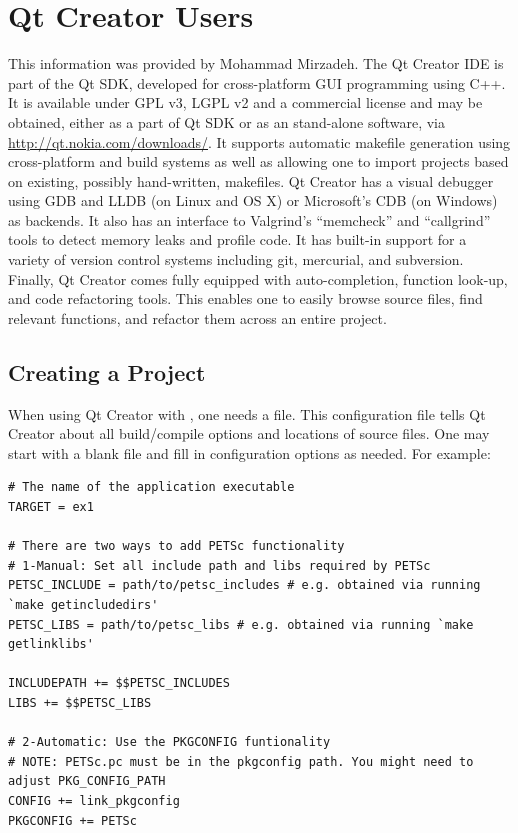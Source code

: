 {{\section{Qt Creator Users} 
This information was provided by Mohammad Mirzadeh.
The Qt Creator IDE is part of the Qt SDK, developed for cross-platform GUI programming using C++. 
It is available under GPL v3, LGPL v2 and a commercial license and may be obtained, either as a 
part of Qt SDK or as an stand-alone software, via \url{http://qt.nokia.com/downloads/}.
It supports automatic makefile generation using cross-platform  and 
build systems as well as allowing one to import projects based on existing, possibly hand-written, makefiles.
Qt Creator has a visual debugger using GDB and LLDB (on Linux and OS X) or Microsoft's
CDB (on Windows) as backends. It also has an interface to Valgrind's ``memcheck'' and ``callgrind''
tools to detect memory leaks and profile code. It has built-in support for a variety of version
control systems including git, mercurial, and subversion. Finally, Qt Creator comes fully equipped with
auto-completion, function look-up, and code refactoring tools. This enables one to easily browse source
files, find relevant functions, and refactor them across an entire project.

\subsection*{Creating a Project}
When using Qt Creator with , one needs a  file. This configuration file
tells Qt Creator about all build/compile options and locations of source files. One may start with
a blank  file and fill in configuration options as needed. For example:
\begin{lstlisting}
# The name of the application executable
TARGET = ex1

# There are two ways to add PETSc functionality
# 1-Manual: Set all include path and libs required by PETSc
PETSC_INCLUDE = path/to/petsc_includes # e.g. obtained via running `make getincludedirs'
PETSC_LIBS = path/to/petsc_libs # e.g. obtained via running `make getlinklibs'

INCLUDEPATH += $$PETSC_INCLUDES
LIBS += $$PETSC_LIBS

# 2-Automatic: Use the PKGCONFIG funtionality
# NOTE: PETSc.pc must be in the pkgconfig path. You might need to adjust PKG_CONFIG_PATH
CONFIG += link_pkgconfig
PKGCONFIG += PETSc


\end{lstlisting}}}
